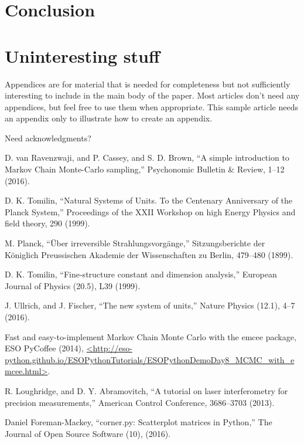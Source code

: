 \documentclass[prb,preprint]{revtex4-1}
\begin{document}
\section{Conclusion}




\appendix*   %

\section{Uninteresting stuff}

Appendices are for material that is needed for completeness but
not sufficiently interesting to include in the main body of the paper.  Most
articles don't need any appendices, but feel free to use them when
appropriate.  This sample article needs an appendix only to illustrate how 
to create an appendix.


\begin{acknowledgments}

Need acknowledgments?
\end{acknowledgments}


\begin{thebibliography}{99}

 D. van Ravenzwaji, and P. Cassey, and S. D. Brown, ``A simple introduction to Markov Chain Monte-Carlo sampling,'' 
Psychonomic Bulletin {\&} Review, 1--12 (2016).  

 D. K. Tomilin, ``Natural Systems of Units. To the Centenary Anniversary of the Planck System,'' 
Proceedings of the XXII Workshop on high Energy Physics and field theory, 290 (1999).  

 M. Planck, ``\"{U}ber irreversible {S}trahlungsvorg\"{a}nge,'' 
Sitzungsberichte der K\"{o}niglich Preussischen Akademie der Wissenschaften zu Berlin, 479--480 (1899).  

 D. K. Tomilin, ``Fine-structure constant and dimension analysis,'' 
European Journal of Physics (20.5), L39 (1999).  

 J. Ullrich, and J. Fischer, ``The new system of units,'' 
Nature Physics (12.1), 4--7 (2016).  

 Fast and easy-to-implement Markov Chain Monte Carlo with the emcee package, ESO PyCoffee (2014),
\url{<http://eso-python.github.io/ESOPythonTutorials/ESOPythonDemoDay8_MCMC_with_emcee.html>}.

 R. Loughridge, and D. Y. Abramovitch, ``A tutorial on laser interferometry for precision measurements,'' 
American Control Conference, 3686--3703 (2013).  

 Daniel Foreman-Mackey, ``corner.py: Scatterplot matrices in Python,'' 
The Journal of Open Source Software (10), (2016).  


\end{thebibliography}
\end{document}
